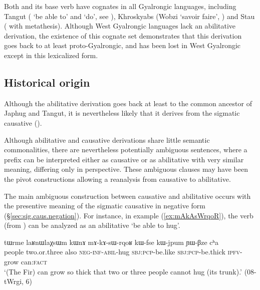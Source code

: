 Both  and its base verb   have cognates in all Gyalrongic languages, including Tangut ( `be able to' and   `do', see \citealt[86;255-256]{jacques14esquisse}), Khroskyabs (Wobzi  `savoir faire', \citealt[475]{lai17khroskyabs}) and Stau ( with metathesis). Although West Gyalrongic languages lack an abilitative derivation, the existence of this cognate set demonstrates that this derivation goes back  to at least proto-Gyalrongic, and has been lost in West Gyalrongic except in this lexicalized form.
 
\subsection{Historical origin} \label{sec:abilitative.origin}
Although the abilitative derivation goes back at least to the common ancestor of Japhug and Tangut, it is nevertheless likely that it derives from the sigmatic causative (\citealt[190]{jacques15causative}).

Although abilitative and causative derivations share little semantic commonalities, there are nevertheless potentially ambiguous sentences, where a  prefix can be interpreted either as causative or as abilitative with very similar meaning, differing only in perspective. These ambiguous clauses may have been the pivot constructions allowing a reanalysis from causative to abilitative.

The main ambiguous construction between causative and abilitative occurs with the presentive meaning of the sigmatic causative in negative form (§\ref{sec:sig.caus.negation}). For instance, in example (\ref{ex:mAkAsWrqoR}), the verb  (from ) can be analyzed as an abilitative `be able to hug'.


 \begin{exe}
\ex \label{ex:mAkAsWrqoR}
\gll tɯrme laʁnɯlaχsɯm kɯnɤ mɤ-kɤ-sɯ-rqoʁ kɯ-fse kɯ-jpum ɲɯ-βze cʰa  \\
people two.or.three also \textsc{neg}-\textsc{inf}-\textsc{abil}-hug \textsc{sbj}:\textsc{pcp}-be.like \textsc{sbj}:\textsc{pcp}-be.thick \textsc{ipfv}-grow can\textsc{:fact} \\
\glt  `(The Fir) can grow so thick that two or three people cannot hug (its trunk).' (08-tWrgi, 6)
   \end{exe}

